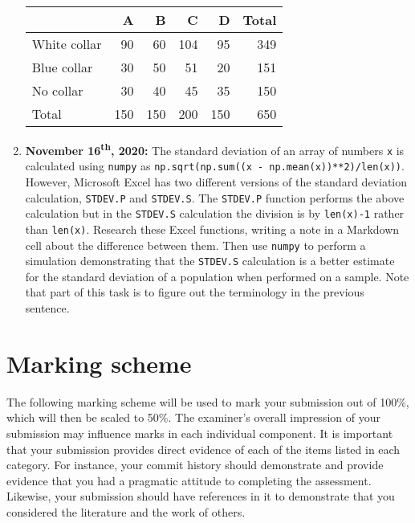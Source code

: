 \documentclass[a4paper, 12pt]{scrartcl}
\begin{document}
\begin{enumerate}
        \begin{table}[H]
          \setlength{\tabcolsep}{12pt}
          \renewcommand{\arraystretch}{1.1}
          \centering
          \begin{tabular}{lrrrrr}
            & A & B & C& D & Total \\
            \midrule
            White collar & 90 & 60 & 104 & 95 & 349 \\
            Blue collar & 30 & 50 & 51 & 20 & 151 \\
            No collar & 30 & 40 & 45 & 35 & 150 \\
            \midrule
            Total & 150 & 150 & 200 & 150 & 650
          \end{tabular}
        \end{table}
        \newpage
      \item
        \textbf{November 16\textsuperscript{th}, 2020:}
        The standard deviation of an array of numbers \texttt{x} is calculated using \texttt{numpy} as \texttt{np.sqrt(np.sum((x - np.mean(x))**2)/len(x))}.
        However, Microsoft Excel has two different versions of the standard deviation calculation, \texttt{STDEV.P} and \texttt{STDEV.S}.
        The \texttt{STDEV.P} function performs the above calculation but in the \texttt{STDEV.S} calculation the division is by \texttt{len(x)-1} rather than \texttt{len(x)}.
        Research these Excel functions, writing a note in a Markdown cell about the difference between them.
        Then use \texttt{numpy} to perform a simulation demonstrating that the \texttt{STDEV.S} calculation is a better estimate for the standard deviation of a population when performed on a sample.
        Note that part of this task is to figure out the terminology in the previous sentence.
    \end{enumerate}

  \newpage

  \section*{Marking scheme}
    The following marking scheme will be used to mark your submission out of 100\%, which will then be scaled to 50\%.
    The examiner's overall impression of your submission may influence marks in each individual component.
    It is important that your submission provides direct evidence of each of the items listed in each category.
    For instance, your commit history should demonstrate and provide evidence that you had a pragmatic attitude to completing the assessment.
    Likewise, your submission should have references in it to demonstrate that you considered the literature and the work of others.
  
\end{document}
